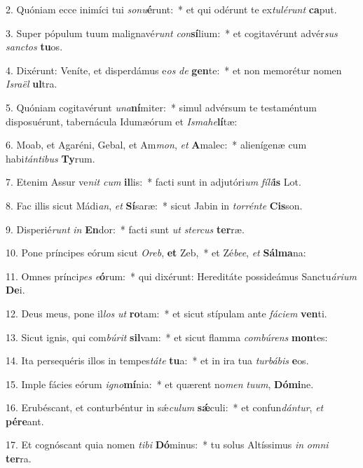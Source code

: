 2. Quóniam ecce inimíci tui \textit{so}\textit{nu}\textbf{é}runt:~*  et qui odérunt te ex\textit{tu}\textit{lé}\textit{runt} \textbf{ca}put.\

3. Super pópulum tuum malignavé\textit{runt} \textit{con}\textbf{sí}lium:~*  et cogitavérunt advér\textit{sus} \textit{sanc}\textit{tos} \textbf{tu}os.\

4. Dixérunt: Veníte, et disperdámus e\textit{os} \textit{de} \textbf{gen}te:~*  et non memorétur nomen \textit{Is}\textit{ra}\textit{ël} \textbf{ul}tra.\

5. Quóniam cogitavérunt \textit{u}\textit{na}\textbf{ní}miter:~*  simul advérsum te testaméntum disposuérunt, tabernácula Idumæórum et \textit{Is}\textit{ma}\textit{he}\textbf{lí}tæ:\

6. Moab, et Agaréni, Gebal, et Am\textit{mon}, \textit{et} \textbf{A}malec:~*  alienígenæ cum habi\textit{tán}\textit{ti}\textit{bus} \textbf{Ty}rum.\

7. Etenim Assur ve\textit{nit} \textit{cum} \textbf{il}lis:~*  facti sunt in adjutóri\textit{um} \textit{fí}\textit{li}\textbf{is} Lot.\

8. Fac illis sicut Mádi\textit{an}, \textit{et} \textbf{Sí}saræ:~*  sicut Jabin in \textit{tor}\textit{rén}\textit{te} \textbf{Cis}son.\

9. Disperié\textit{runt} \textit{in} \textbf{En}dor:~*  facti sunt \textit{ut} \textit{ster}\textit{cus} \textbf{ter}ræ.\

10. Pone príncipes eórum sicut \textit{O}\textit{reb}, \textbf{et} Zeb,~*  et Zé\textit{be}\textit{e}, \textit{et} \textbf{Sál}\textbf{ma}na:\

11. Omnes prínci\textit{pes} \textit{e}\textbf{ó}rum:~*  qui dixérunt: Hereditáte possideámus Sanctu\textit{á}\textit{ri}\textit{um} \textbf{De}i.\

12. Deus meus, pone il\textit{los} \textit{ut} \textbf{ro}tam:~*  et sicut stípulam ante \textit{fá}\textit{ci}\textit{em} \textbf{ven}ti.\

13. Sicut ignis, qui com\textit{bú}\textit{rit} \textbf{sil}vam:~*  et sicut flamma \textit{com}\textit{bú}\textit{rens} \textbf{mon}tes:\

14. Ita persequéris illos in tempes\textit{tá}\textit{te} \textbf{tu}a:~*  et in ira tua \textit{tur}\textit{bá}\textit{bis} \textbf{e}os.\

15. Imple fácies eórum \textit{i}\textit{gno}\textbf{mí}nia:~*  et quærent no\textit{men} \textit{tu}\textit{um}, \textbf{Dó}\textbf{mi}ne.\

16. Erubéscant, et conturbéntur in sǽ\textit{cu}\textit{lum} \textbf{sǽ}culi:~*  et confun\textit{dán}\textit{tur}, \textit{et} \textbf{pér}\textbf{e}ant.\

17. Et cognóscant quia nomen \textit{ti}\textit{bi} \textbf{Dó}minus:~*  tu solus Altíssimus \textit{in} \textit{om}\textit{ni} \textbf{ter}ra.\

